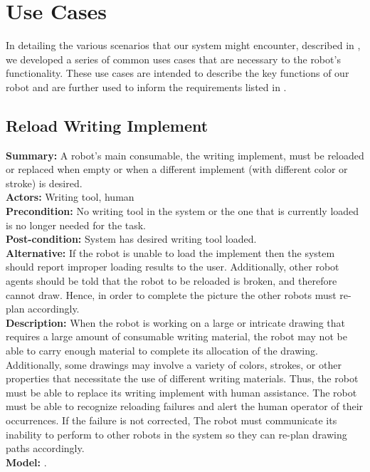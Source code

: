 
\section{Use Cases}
\label{sec:use_cases}
In detailing the various scenarios that our system might encounter, described in , we developed a series of common uses cases that are necessary to the robot's functionality. These use cases are intended to describe the key functions of our robot and are further used to inform the requirements listed in .

\subsection{Reload Writing Implement}
\textbf{Summary:} A robot's main consumable, the writing implement, must be reloaded or replaced when empty or when a different implement (with different color or stroke) is desired. \\
\textbf{Actors:}  Writing tool, human \\
\textbf{Precondition:} No writing tool in the system or the one that is currently loaded is no longer needed for the task. \\
\textbf{Post-condition:} System has desired writing tool loaded. \\
\textbf{Alternative:} If the robot is unable to load the implement then the system should report improper loading results to the user. Additionally, other robot agents should be told that the robot to be reloaded is broken, and therefore cannot draw. Hence, in order to complete the picture the other robots must re-plan accordingly. \\
\textbf{Description:} When the robot is working on a large or intricate drawing that requires a large amount of consumable writing material, the robot may not be able to carry enough material to complete its allocation of the drawing. Additionally, some drawings may involve a variety of colors, strokes, or other properties that necessitate the use of different writing materials. Thus, the robot must be able to replace its writing implement with human assistance. The robot must be able to recognize reloading failures and alert the human operator of their occurrences. If the failure is not corrected, The robot must communicate its inability to perform to other robots in the system so they can re-plan drawing paths accordingly. \\
\textbf{Model:} .\\
